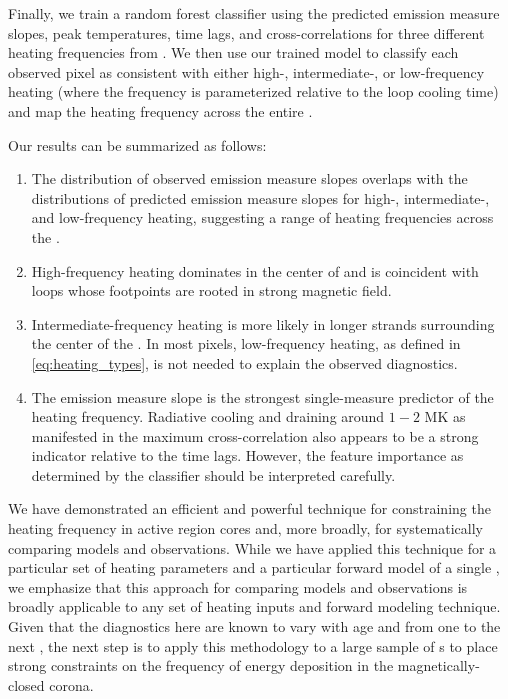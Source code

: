Finally, we train a random forest classifier using the predicted emission measure slopes, peak temperatures, time lags, and cross-correlations for three different heating frequencies from .
We then use our trained model to classify each observed pixel as consistent with either high-, intermediate-, or low-frequency heating (where the frequency is parameterized relative to the loop cooling time) and map the heating frequency across the entire \AR{}.

Our results can be summarized as follows:
\begin{enumerate}
    \item The distribution of observed emission measure slopes overlaps with the distributions of predicted emission measure slopes for high-, intermediate-, and low-frequency heating, suggesting a range of heating frequencies across the \AR{}.
    \item High-frequency heating dominates in the center of \AR{} and is coincident with loops whose footpoints are rooted in strong magnetic field.
    \item Intermediate-frequency heating is more likely in longer strands surrounding the center of the \AR{}. In most pixels, low-frequency heating, as defined in \autoref{eq:heating_types}, is not needed to explain the observed diagnostics.
    \item The emission measure slope is the strongest single-measure predictor of the heating frequency. Radiative cooling and draining around $1-2$ MK as manifested in the maximum cross-correlation also appears to be a strong indicator relative to the time lags. However, the feature importance as determined by the classifier should be interpreted carefully.
\end{enumerate}

We have demonstrated an efficient and powerful technique for constraining the heating frequency in active region cores and, more broadly, for systematically comparing models and observations.
While we have applied this technique for a particular set of heating parameters and a particular forward model of a single \AR{}, we emphasize that this approach for comparing models and observations is broadly applicable to any set of heating inputs and forward modeling technique. 
Given that the diagnostics here are known to vary with age \citep[e.g.][]{schmelz_cold_2012,del_zanna_evolution_2015} and from one \AR{} to the next \citep{warren_systematic_2012,viall_survey_2017}, the next step is to apply this methodology to a large sample of \AR s to place strong constraints on the frequency of energy deposition in the magnetically-closed corona.
